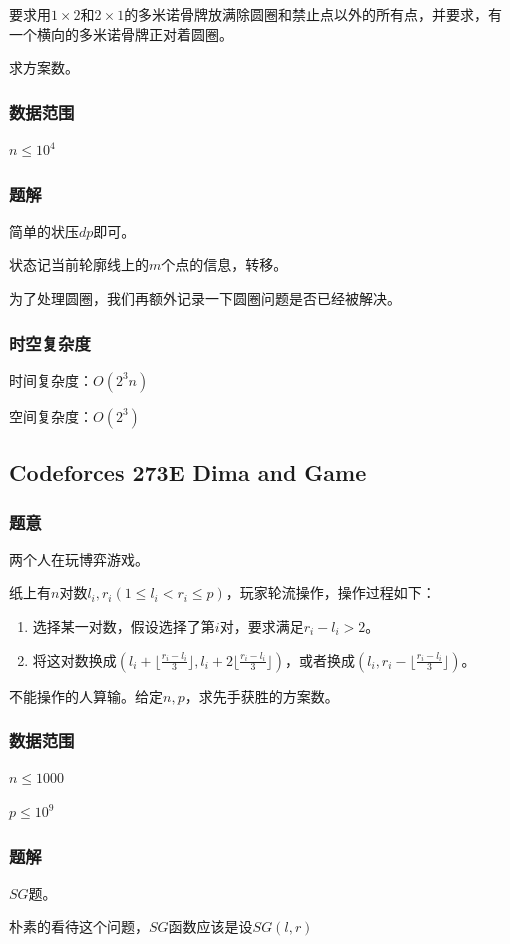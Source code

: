 \documentclass{ctexart}
\begin{document}
要求用$1 \times 2$和$2 \times 1$的多米诺骨牌放满除圆圈和禁止点以外的所有点，并要求，有一个横向的多米诺骨牌正对着圆圈。

求方案数。
\subsubsection{数据范围}
$n \le 10^4$
\subsubsection{题解}
简单的状压$dp$即可。

状态记当前轮廓线上的$m$个点的信息，转移。

为了处理圆圈，我们再额外记录一下圆圈问题是否已经被解决。
\subsubsection{时空复杂度}
时间复杂度：$O(2^3 n)$

空间复杂度：$O(2^3)$
\subsection{Codeforces 273E Dima and Game}
\subsubsection{题意}
两个人在玩博弈游戏。

纸上有$n$对数$l_i,r_i(1 \le l_i < r_i \le p)$，玩家轮流操作，操作过程如下：

\begin{enumerate}
\item 选择某一对数，假设选择了第$i$对，要求满足$r_i-l_i>2$。
\item 将这对数换成$(l_i+\lfloor \frac{r_i-l_i}{3} \rfloor,l_i+2\lfloor \frac{r_i-l_i}{3} \rfloor)$，或者换成$(l_i,r_i-\lfloor \frac{r_i-l_i}{3} \rfloor)$。
\end{enumerate}

不能操作的人算输。给定$n,p$，求先手获胜的方案数。
\subsubsection{数据范围}
$n \le 1000$

$p \le 10^9$
\subsubsection{题解}
$SG$题。

朴素的看待这个问题，$SG$函数应该是设$SG(l,r)$
\end{document}
